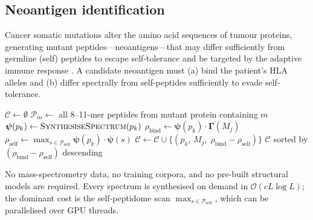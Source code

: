 \documentclass[twocolumn,11pt,a4paper]{article}
\theoremstyle{definition}
\theoremstyle{remark}
\begin{document}
\subsection{Neoantigen identification}
\label{sec:neoantigen}

Cancer somatic mutations alter the amino acid sequences of tumour proteins,
generating mutant peptides---neoantigens---that may differ sufficiently from
germline (self) peptides to escape self-tolerance and be targeted by the
adaptive immune response \citep{schumacher2015}. A candidate neoantigen must
(a) bind the patient's HLA alleles and (b) differ spectrally from self-peptides
sufficiently to evade self-tolerance.

\begin{algorithm}
\caption{Neoantigen identification}
\label{alg:neoantigen}
\begin{algorithmic}[1]
\State $\mathcal{C} \gets \emptyset$
  \State $\mathcal{P}_m \gets$ all 8--11-mer peptides from mutant protein
    containing $m$
    \State $\bm{\psi}(p_k) \gets \textsc{SynthesiseSpectrum}(p_k)$
      \hfill{}
      \State $\rho_{\mathrm{bind}} \gets \bm{\psi}(p_k)\cdot\bm{\Gamma}(M_j)$
      \State $\rho_{\mathrm{self}} \gets \max_{s\in\mathcal{P}_{\mathrm{self}}}
        \bm{\psi}(p_k)\cdot\bm{\psi}(s)$
        \State $\mathcal{C} \gets \mathcal{C} \cup
          \{(p_k,\, M_j,\; \rho_{\mathrm{bind}} - \rho_{\mathrm{self}})\}$
      \EndIf
    \EndFor
  \EndFor
\EndFor
\State \Return $\mathcal{C}$ sorted by $(\rho_{\mathrm{bind}} - \rho_{\mathrm{self}})$
  descending
\end{algorithmic}
\end{algorithm}

No mass-spectrometry data, no training corpora, and no pre-built structural
models are required. Every spectrum is synthesised on demand in
$\mathcal{O}(cL\log L)$; the dominant cost is the self-peptidome scan
$\max_{s\in\mathcal{P}_{\mathrm{self}}}$, which can be parallelised over
GPU threads.
\end{document}
